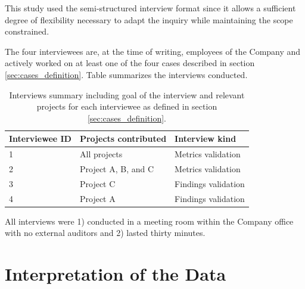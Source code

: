 

This study used the semi-structured interview format since it allows a sufficient degree of flexibility necessary to adapt the inquiry while maintaining the scope constrained.

The four interviewees are, at the time of writing, employees of the Company and actively worked on at least one of the four cases described in section \ref{sec:cases_definition}. Table summarizes the interviews conducted.

\begin{table}[!htbp]
	\centering
	\tabulinesep=1.2mm
	\begin{tabu} to \textwidth {|X|X|X|}

		\hline
		\textbf{Interviewee ID} & \textbf{Projects contributed} & \textbf{Interview kind} \\
		\hline

		1 & All projects & Metrics validation \\
		\hline

		2 & Project A, B, and C & Metrics validation \\
		\hline

		3 & Project C & Findings validation \\
		\hline

		4 & Project A & Findings validation \\
		\hline

	\end{tabu}
	\label{tab:interviews_summary}
	\caption[Summary of conducted interviews]{Interviews summary including goal of the interview and relevant projects for each interviewee as defined in section \ref{sec:cases_definition}.}
\end{table}

All interviews were 1) conducted in a meeting room within the Company office with no external auditors and 2) lasted thirty minutes.





%
%
%
%


%
%
%
%
\section{Interpretation of the Data} \label{data_interpretation}

